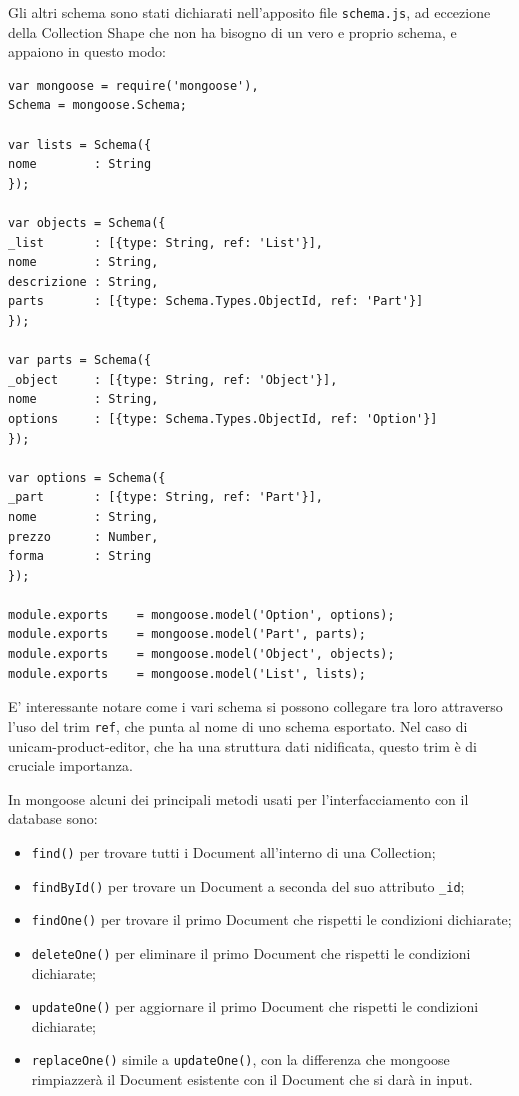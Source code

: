 Gli altri schema sono stati dichiarati nell'apposito file \texttt{schema.js}, ad eccezione della Collection Shape che non ha bisogno di un vero e proprio schema, e appaiono in questo modo:

\begin{lstlisting}[caption={/app/schema.js}, style=javaScriptCode]
var mongoose = require('mongoose'),
Schema = mongoose.Schema;

var lists = Schema({
nome        : String
});

var objects = Schema({
_list       : [{type: String, ref: 'List'}],
nome        : String,
descrizione : String,
parts       : [{type: Schema.Types.ObjectId, ref: 'Part'}]
});

var parts = Schema({
_object     : [{type: String, ref: 'Object'}],
nome        : String,
options     : [{type: Schema.Types.ObjectId, ref: 'Option'}]
});

var options = Schema({
_part       : [{type: String, ref: 'Part'}],
nome        : String,
prezzo      : Number,
forma       : String
});

module.exports    = mongoose.model('Option', options);
module.exports    = mongoose.model('Part', parts);
module.exports    = mongoose.model('Object', objects);
module.exports    = mongoose.model('List', lists);
\end{lstlisting}

E' interessante notare come i vari schema si possono collegare tra loro attraverso l'uso del trim \texttt{ref}, che punta al nome di uno schema esportato.
Nel caso di unicam-product-editor, che ha una struttura dati nidificata, questo trim è di cruciale importanza.

In mongoose alcuni dei principali metodi usati per l'interfacciamento con il database sono:
\begin{itemize}
	\item \texttt{find()} per trovare tutti i Document all'interno di una Collection;
	\item \texttt{findById()} per trovare un Document a seconda del suo attributo \texttt{\_id};
	\item \texttt{findOne()} per trovare il primo Document che rispetti le condizioni dichiarate;
	\item \texttt{deleteOne()} per eliminare il primo Document che rispetti le condizioni dichiarate;
	\item \texttt{updateOne()} per aggiornare il primo Document che rispetti le condizioni dichiarate;
	\item \texttt{replaceOne()} simile a \texttt{updateOne()}, con la differenza che mongoose rimpiazzerà il Document esistente con il Document che si darà in input.
\end{itemize}

